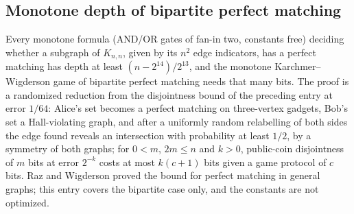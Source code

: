 \begin{result}
\subsection{Monotone depth of bipartite perfect matching}
Every monotone formula (AND/OR gates of fan-in two, constants free) deciding whether a
subgraph of $K_{n,n}$, given by its $n^2$ edge indicators, has a perfect matching has depth at
least $(n-2^{14})/2^{13}$, and the monotone Karchmer--Wigderson game of bipartite perfect
matching needs that many bits. The proof is a randomized reduction from the disjointness bound
of the preceding entry at error $1/64$: Alice's set becomes a perfect matching on three-vertex
gadgets, Bob's set a Hall-violating graph, and after a uniformly random relabelling of both
sides the edge found reveals an intersection with probability at least $1/2$, by a symmetry of
both graphs; for $0<m$, $2m\le n$ and $k>0$, public-coin disjointness of $m$ bits at error
$2^{-k}$ costs at most $k(c+1)$ bits given a game protocol of $c$ bits. Raz and Wigderson proved
the bound for perfect matching in general graphs; this entry covers the bipartite case only,
and the constants are not optimized.\citep{RazWigderson1992,KushilevitzNisan1997}
\end{result}



